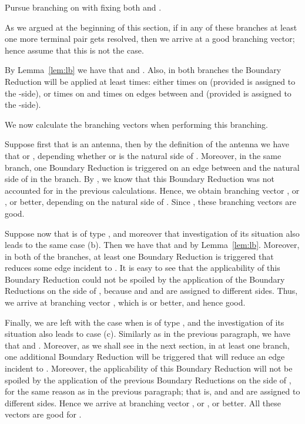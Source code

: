 \begin{branching}
Pursue branching on  with fixing both  and .
\end{branching}

As we argued at the beginning of this section, if in any of these branches at least one more terminal pair gets resolved, then we arrive at a good branching vector; hence assume that this is not the case.

By Lemma~\ref{lem:lb} we have that  and . Also, in both branches the Boundary Reduction will be applied at least  times: either  times on  (provided  is assigned to the -side), or  times on  and  times on edges between  and  (provided  is assigned to the -side).

We now calculate the branching vectors when performing this branching.

Suppose first that  is an antenna, then by the definition of the antenna we have that  or , depending whether  or  is the natural side of . Moreover, in the same branch, one Boundary Reduction is triggered on an edge between  and the natural side of  in the branch. By , we know that this Boundary Reduction was not accounted for in the previous calculations. Hence, we obtain branching vector , or , or better, depending on the natural side of . Since , these branching vectors are good.

Suppose now that  is of type , and moreover that investigation of its situation also leads to the same case (b). Then we have that  and  by Lemma~\ref{lem:lb}. Moreover, in both of the branches, at least one Boundary Reduction is triggered that reduces some edge incident to . It is easy to see that the applicability of this Boundary Reduction could not be spoiled by the application of the  Boundary Reductions on the side of , because  and  and  are assigned to different sides. Thus, we arrive at branching vector , which is  or better, and hence good.

Finally, we are left with the case when  is of type , and the investigation of its situation also leads to case (c). Similarly as in the previous paragraph, we have that  and . Moreover, as we shall see in the next section, in at least one branch, one additional Boundary Reduction will be triggered that will reduce an edge incident to . Moreover, the applicability of this Boundary Reduction will not be spoiled by the application of the previous  Boundary Reductions on the side of , for the same reason as in the previous paragraph; that is,  and  and  are assigned to different sides. Hence we arrive at branching vector , or , or better. All these vectors are good for .












